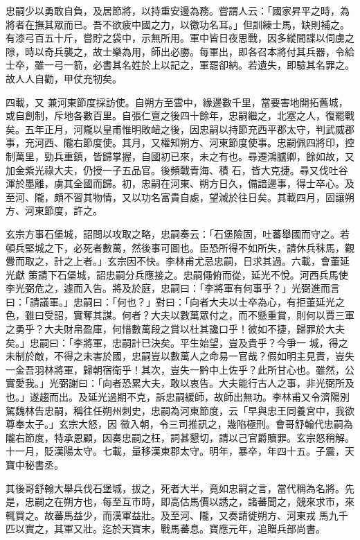 \begin{pinyinscope}
 忠嗣少以勇敢自負，及居節將，以持重安邊為務。嘗謂人云：「國家昇平之時，為將者在撫其眾而已。吾不欲疲中國之力，以徼功名耳。」但訓練士馬，缺則補之。有漆弓百五十斤，嘗貯之袋中，示無所用。軍中皆日夜思戰，因多縱間諜以伺虜之隙，時以奇兵襲之，故士樂為用，師出必勝。每軍出，即各召本將付其兵器，令給士卒，雖一弓一箭，必書其名姓於上以記之，軍罷卻納。若遺失，即驗其名罪之。故人人自勸，甲仗充牣矣。



 四載，又
 兼河東節度採訪使。自朔方至雲中，緣邊數千里，當要害地開拓舊城，或自創制，斥地各數百里。自張仁亶之後四十餘年，忠嗣繼之，北塞之人，復罷戰矣。五年正月，河隴以皇甫惟明敗衄之後，因忠嗣以持節充西平郡太守，判武威郡事，充河西、隴右節度使。其月，又權知朔方、河東節度使事。忠嗣佩四將印，控制萬里，勁兵重鎮，皆歸掌握，自國初已來，未之有也。尋遷鴻臚卿，餘如故，又加金紫光祿大夫，仍授一子五品官。後頻戰青海、積
 石，皆大克捷。尋又伐吐谷渾於墨離，虜其全國而歸。初，忠嗣在河東、朔方日久，備諳邊事，得士卒心。及至河、隴，頗不習其物情，又以功名富貴自處，望減於往日矣。其載四月，固讓朔方、河東節度，許之。



 玄宗方事石堡城，詔問以攻取之略，忠嗣奏云：「石堡險固，吐蕃舉國而守之。若頓兵堅城之下，必死者數萬，然後事可圖也。臣恐所得不如所失，請休兵秣馬，觀釁而取之，計之上者。」玄宗因不快。李林甫尤忌忠嗣，日求其過。六載，會董延光獻
 策請下石堡城，詔忠嗣分兵應接之。忠嗣僶俯而從，延光不悅。河西兵馬使李光弼危之，遽而入告。將及於庭，忠嗣曰：「李將軍有何事乎？」光弼進而言曰：「請議軍。」忠嗣曰：「何也？」對曰：「向者大夫以士卒為心，有拒董延光之色，雖曰受詔，實奪其謀。何者？大夫以數萬眾付之，而不懸重賞，則何以賈三軍之勇乎？大夫財帛盈庫，何惜數萬段之賞以杜其讒口乎！彼如不捷，歸罪於大夫矣。」忠嗣曰：「李將軍，忠嗣計已決矣。平生始望，豈及貴乎？今爭一
 城，得之未制於敵，不得之未害於國，忠嗣豈以數萬人之命易一官哉？假如明主見責，豈失一金吾羽林將軍，歸朝宿衛乎！其次，豈失一黔中上佐乎？此所甘心也。雖然，公實愛我。」光弼謝曰：「向者恐累大夫，敢以衷告。大夫能行古人之事，非光弼所及也。」遂趨而出。及延光過期不克，訴忠嗣緩師，故師出無功。李林甫又令濟陽別駕魏林告忠嗣，稱往任朔州刺史，忠嗣為河東節度，云「早與忠王同養宮中，我欲尊奉太子。」玄宗大怒，因
 徵入朝，令三司推訊之，幾陷極刑。會哥舒翰代忠嗣為隴右節度，特承恩顧，因奏忠嗣之枉，詞甚懇切，請以己官爵贖罪。玄宗怒稍解。十一月，貶漢陽太守。七載，量移漢東郡太守。明年，暴卒，年四十五。子震，天寶中秘書丞。



 其後哥舒翰大舉兵伐石堡城，拔之，死者大半，竟如忠嗣之言，當代稱為名將。先是，忠嗣之在朔方也，每至互市時，即高估馬價以誘之，諸蕃聞之，競來求市，來輒買之。故蕃馬益少，而漢軍益壯。及至河、隴，又奏請徙朔方、河東戎
 馬九千匹以實之，其軍又壯。迄於天寶末，戰馬蕃息。寶應元年，追贈兵部尚書。




\end{pinyinscope}
